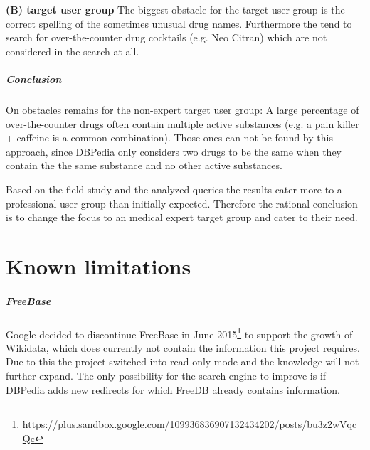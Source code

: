 \documentclass[11pt,titlepage,oneside,openany]{book}
\begin{document}
\textbf{(B) target user group} The biggest obstacle for the target user group is the correct spelling of the sometimes unusual drug names. Furthermore the tend to search for over-the-counter drug cocktails (e.g. Neo Citran) which are not considered in the search at all.

\paragraph{Conclusion}
\label{sec:conclusion}

On obstacles remains for the non-expert target user group: 
A large percentage of over-the-counter drugs often contain multiple active substances (e.g. a pain killer + caffeine is a common combination). Those ones can not be found by this approach, since DBPedia only considers two drugs to be the same when they contain the the same substance and no other active substances.

Based on the field study and the analyzed queries the results cater more to a professional user group than initially expected. Therefore the rational conclusion is to change the focus to an medical expert target group and cater to their need.



\label{ex:ecotrin}


\chapter{Known limitations}
\label{cha:limiations}



\label{prob:freebase}

\paragraph{FreeBase}
Google decided to discontinue FreeBase in June 2015\footnote{\url{https://plus.sandbox.google.com/109936836907132434202/posts/bu3z2wVqcQc}} to support the growth of Wikidata, which does currently not contain the information this project requires. Due to this the project switched into read-only mode and the knowledge will not further expand. The only possibility for the search engine to improve is if DBPedia adds new redirects for which FreeDB already contains information. 
\end{document}
